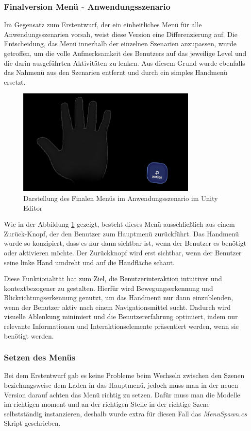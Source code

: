\subsubsection{Finalversion Menü - Anwendungsszenario}
Im Gegensatz zum Erstentwurf, der ein einheitliches Menü für alle Anwendungsszenarien vorsah, weist diese Version eine
Differenzierung auf. Die Entscheidung, das Menü innerhalb der einzelnen Szenarien anzupassen, wurde getroffen, um die volle
Aufmerksamkeit des Benutzers auf das jeweilige Level und die darin ausgeführten Aktivitäten zu lenken. Aus diesem Grund
wurde ebenfalls das Nahmenü aus den Szenarien entfernt und durch ein simples Handmenü ersetzt.

\begin{figure}[H]
    \centering
    \includegraphics[width=0.8\textwidth]{images/backbutton.png}
    \caption{Darstellung des Finalen Menüs im Anwendungsszenario im Unity Editor}
    \label{fig:backbutton}
\end{figure}

Wie in der Abbildung \ref{fig:backbutton} gezeigt, besteht dieses Menü ausschließlich aus einem Zurück-Knopf, der den
Benutzer zum Hauptmenü zurückführt. Das Handmenü wurde so konzipiert, dass es nur dann sichtbar ist, wenn der Benutzer
es benötigt oder aktivieren möchte.  Der Zurückknopf wird erst sichtbar, wenn der Benutzer seine linke Hand umdreht und
auf die Handfläche schaut.

Diese Funktionalität hat zum Ziel, die Benutzerinteraktion intuitiver und kontextbezogener zu gestalten. Hierfür wird
Bewegungserkennung und Blickrichtungserkennung genutzt, um das Handmenü nur dann einzublenden, wenn der Benutzer aktiv
nach einem Navigationsmittel sucht. Dadurch wird visuelle Ablenkung minimiert und die Benutzererfahrung optimiert, indem
nur relevante Informationen und Interaktionselemente präsentiert werden, wenn sie benötigt werden.

\subsubsection{Setzen des Menüs}
Bei dem Erstentwurf gab es keine Probleme beim Wechseln zwischen den Szenen beziehungsweise dem Laden in das Hauptmenü,
jedoch muss man in der neuen Version darauf achten das Menü richtig zu setzen. Dafür muss man die Modelle im richtigen
moment und an der richtigen Stelle in der richtige Szene selbstständig instanzieren, deshalb wurde extra für diesen Fall
das \textit{MenuSpawn.cs} Skript geschrieben.

